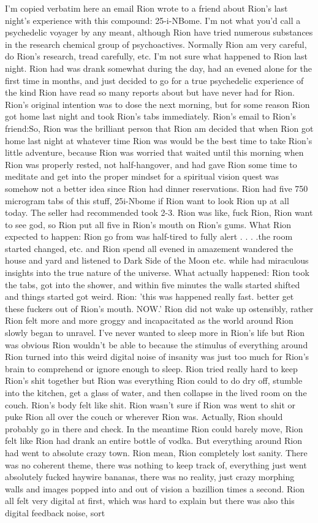 \documentclass[12pt]{book}
\begin{document}
I'm copied verbatim here an email Rion wrote to a friend about Rion's last night's experience with this compound: 25-i-NBome. I'm not what you'd call a psychedelic voyager by any meant, although Rion have tried numerous substances in the research chemical group of psychoactives. Normally Rion am very careful, do Rion's research, tread carefully, etc. I'm not sure what happened to Rion last night. Rion had was drank somewhat during the day, had an evened alone for the first time in months, and just decided to go for a true psychedelic experience of the kind Rion have read so many reports about but have never had for Rion. Rion's original intention was to dose the next morning, but for some reason Rion got home last night and took Rion's tabs immediately. Rion's email to Rion's friend:So, Rion was the brilliant person that Rion am decided that when Rion got home last night at whatever time Rion was would be the best time to take Rion's little adventure, because Rion was worried that waited until this morning when Rion was properly rested, not half-hangover, and had gave Rion some time to meditate and get into the proper mindset for a spiritual vision quest was somehow not a better idea since Rion had dinner reservations. Rion had five 750 microgram tabs of this stuff, 25i-Nbome if Rion want to look Rion up at all today. The seller had recommended took 2-3. Rion was like, fuck Rion, Rion want to see god, so Rion put all five in Rion's mouth on Rion's gums. What Rion expected to happen: Rion go from was half-tired to fully alert . . .  .the room started changed, etc. and Rion spend all evened in amazement wandered the house and yard and listened to Dark Side of the Moon etc. while had miraculous insights into the true nature of the universe. What actually happened: Rion took the tabs, got into the shower, and within five minutes the walls started shifted and things started got weird. Rion: 'this was happened really fast. better get these fuckers out of Rion's mouth. NOW.' Rion did not wake up ostensibly, rather Rion felt more and more groggy and incapacitated as the world around Rion slowly began to unravel. I've never wanted to sleep more in Rion's life but Rion was obvious Rion wouldn't be able to because the stimulus of everything around Rion turned into this weird digital noise of insanity was just too much for Rion's brain to comprehend or ignore enough to sleep. Rion tried really hard to keep Rion's shit together but Rion was everything Rion could to do dry off, stumble into the kitchen, get a glass of water, and then collapse in the lived room on the couch. Rion's body felt like shit. Rion wasn't sure if Rion was went to shit or puke Rion all over the couch or wherever Rion was. Actually, Rion should probably go in there and check. In the meantime Rion could barely move, Rion felt like Rion had drank an entire bottle of vodka. But everything around Rion had went to absolute crazy town. Rion mean, Rion completely lost sanity. There was no coherent theme, there was nothing to keep track of, everything just went absolutely fucked haywire bananas, there was no reality, just crazy morphing walls and images popped into and out of vision a bazillion times a second. Rion all felt very digital at first, which was hard to explain but there was also this digital feedback noise, sort 
\end{document}
